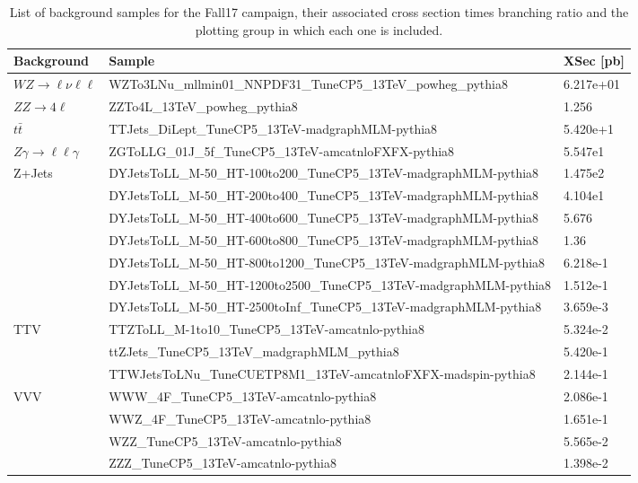 \begin{sidewaystable}[htb]
\begin{center}
  \caption{List of background samples for the Fall17 campaign, their
    associated cross section times branching ratio and the plotting group
    in which each one is included.}
\footnotesize
\begin{tabular}{|l|l|l|}
\hline
Background  & Sample & XSec [pb] \\ \hline
\hline $WZ\rightarrow\ell\nu\ell\ell$
&WZTo3LNu\_mllmin01\_NNPDF31\_TuneCP5\_13TeV\_powheg\_pythia8  & 6.217e+01 \\
\hline $ZZ\rightarrow4\ell$
&ZZTo4L\_13TeV\_powheg\_pythia8 & 1.256 \\
\hline $t\bar{t}$
&TTJets\_DiLept\_TuneCP5\_13TeV-madgraphMLM-pythia8 & 5.420e+1 \\
\hline $Z\gamma\rightarrow\ell\ell\gamma$
&ZGToLLG\_01J\_5f\_TuneCP5\_13TeV-amcatnloFXFX-pythia8 & 5.547e1 \\
\hline Z+Jets
& DYJetsToLL\_M-50\_HT-100to200\_TuneCP5\_13TeV-madgraphMLM-pythia8   & 1.475e2 \\
& DYJetsToLL\_M-50\_HT-200to400\_TuneCP5\_13TeV-madgraphMLM-pythia8   & 4.104e1 \\
& DYJetsToLL\_M-50\_HT-400to600\_TuneCP5\_13TeV-madgraphMLM-pythia8   & 5.676   \\
& DYJetsToLL\_M-50\_HT-600to800\_TuneCP5\_13TeV-madgraphMLM-pythia8   & 1.36    \\
& DYJetsToLL\_M-50\_HT-800to1200\_TuneCP5\_13TeV-madgraphMLM-pythia8  & 6.218e-1\\
& DYJetsToLL\_M-50\_HT-1200to2500\_TuneCP5\_13TeV-madgraphMLM-pythia8 & 1.512e-1\\
& DYJetsToLL\_M-50\_HT-2500toInf\_TuneCP5\_13TeV-madgraphMLM-pythia8  & 3.659e-3\\
\hline TTV
&TTZToLL\_M-1to10\_TuneCP5\_13TeV-amcatnlo-pythia8      & 5.324e-2    \\
&ttZJets\_TuneCP5\_13TeV\_madgraphMLM\_pythia8          &  5.420e-1   \\
&TTWJetsToLNu\_TuneCUETP8M1\_13TeV-amcatnloFXFX-madspin-pythia8 & 2.144e-1 \\
\hline VVV
&WWW\_4F\_TuneCP5\_13TeV-amcatnlo-pythia8 & 2.086e-1 \\
&WWZ\_4F\_TuneCP5\_13TeV-amcatnlo-pythia8 & 1.651e-1 \\
&WZZ\_TuneCP5\_13TeV-amcatnlo-pythia8     & 5.565e-2 \\
&ZZZ\_TuneCP5\_13TeV-amcatnlo-pythia8     & 1.398e-2 \\

\end{tabular}
\end{center}
\end{sidewaystable}
